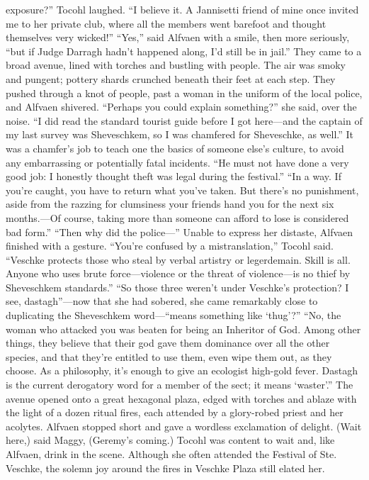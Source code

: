 \documentclass[9pt]{article}
\begin{document}
exposure?”
Tocohl laughed. “I believe it. A Jannisetti friend of mine once invited me to her private club, where all
the members went barefoot and thought themselves very wicked!”
“Yes,” said Alfvaen with a smile, then more seriously, “but if Judge Darragh hadn’t happened along,
I’d still be in jail.”
They came to a broad avenue, lined with torches and bustling with people. The air was smoky and
pungent; pottery shards crunched beneath their feet at each step.
They pushed through a knot of people, past a woman in the uniform of the local police, and Alfvaen
shivered. “Perhaps you could explain something?” she said, over the noise. “I did read the standard
tourist guide before I got here—and the captain of my last survey was Sheveschkem, so I was chamfered
for Sheveschke, as well.” It was a chamfer’s job to teach one the basics of someone else’s culture, to
avoid any embarrassing or potentially fatal incidents. “He must not have done a very good job: I honestly
thought theft was legal during the festival.”
“In a way. If you’re caught, you have to return what you’ve taken. But there’s no punishment, aside
from the razzing for clumsiness your friends hand you for the next six months.—Of course, taking more
than someone can afford to lose is considered bad form.”
“Then why did the police—” Unable to express her distaste, Alfvaen finished with a gesture.
“You’re confused by a mistranslation,” Tocohl said. “Veschke protects those who steal by verbal
artistry or legerdemain. Skill is all. Anyone who uses brute force—violence or the threat of violence—is
no thief by Sheveschkem standards.”
“So those three weren’t under Veschke’s protection? I see, dastagh”—now that she had sobered,
she came remarkably close to duplicating the Sheveschkem word—“means something like ‘thug’?”
“No, the woman who attacked you was beaten for being an Inheritor of God. Among other things,
they believe that their god gave them dominance over all the other species, and that they’re entitled to use
them, even wipe them out, as they choose. As a philosophy, it’s enough to give an ecologist high-gold
fever. Dastagh is the current derogatory word for a member of the sect; it means ‘waster’.”
The avenue opened onto a great hexagonal plaza, edged with torches and ablaze with the light of a
dozen ritual fires, each attended by a glory-robed priest and her acolytes. Alfvaen stopped short and
gave a wordless exclamation of delight.
(Wait here,) said Maggy, (Geremy’s coming.)
Tocohl was content to wait and, like Alfvaen, drink in the scene. Although she often attended the
Festival of Ste. Veschke, the solemn joy around the fires in Veschke Plaza still elated her.
\end{document}
